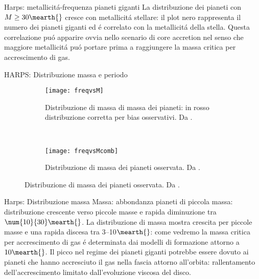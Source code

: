 \begin{wordonframe}{Harps: metallicit\'a-frequenza pianeti giganti}
La distribuzione dei pianeti con $M\geq30\mearth{}$ cresce con metallicit\'a stellare: il plot nero rappresenta il numero dei pianeti giganti ed \'e correlato con la metallicit\'a della stella.
Questa correlazione pu\'o apparire ovvia nello scenario di core accretion nel senso che maggiore metallicit\'a pu\'o portare prima a raggiungere la massa critica per accrescimento di gas.
\end{wordonframe}

\begin{frame}{HARPS: Distribuzione massa e periodo}
\begin{figure}[!ht]
	\begin{subfigure}[b]{0.45\textwidth} \centering \texttt{[image: freqvsM]}
		\caption{Distribuzione di massa di massa dei pianeti: in rosso distribuzione corretta per bias osservativi. Da \cite{mayor2011harps}.}\label{fig:freqvsM} \end{subfigure}
	~
	\begin{subfigure}[b]{0.45\textwidth} \centering \texttt{[image: freqvsMcomb]}
		\caption{Distribuzione di massa dei pianeti osservata. Da \cite{mayor2011harps}.}\label{fig:freqvsMcomb}
	\end{subfigure}
\end{figure}
\end{frame}

\begin{wordonframe}{Harps: Distribuzione massa}
Massa: abbondanza pianeti di piccola massa: distribuzione crescente verso piccole masse e rapida diminuzione tra $\num{10}{30}\mearth{}$.
La distribuzione di massa mostra crescita per piccole masse e una rapida discesa tra \numrange{3}{10}$\mearth{}$: come vedremo la massa critica per accrescimento di gas \'e determinata dai modelli di formazione attorno a $10\mearth{}$.
Il picco nel regime dei pianeti giganti potrebbe essere dovuto ai pianeti che hanno accresciuto il gas nella fascia attorno all'orbita: rallentamento dell'accrescimento limitato dall'evoluzione viscosa del disco.
\end{wordonframe}

